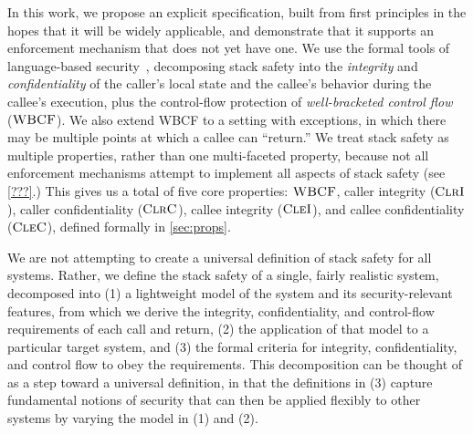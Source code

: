 In this work, we propose an explicit specification, built from first principles
in the hopes that it will be widely applicable, and demonstrate that it supports
an enforcement mechanism that does not yet have one.
We use the formal tools of language-based
security~\cite{sabelfeld2003language}, decomposing stack safety into
the {\em integrity} and {\em confidentiality} of the caller’s local state
and the callee's behavior during the callee's execution, plus the control-flow protection
of {\em well-bracketed control flow}~\cite{SkorstengaardSTKJFP} (\(\textnormal{\sc WBCF}\)).
\ifexceptions
We also extend WBCF to a setting with exceptions,
in which there may be multiple points at which a callee can ``return.''
\fi
%
We treat stack safety as multiple properties, rather than one multi-faceted property, because
not all enforcement mechanisms attempt to implement all aspects of stack safety (see \cref{???}.)
%
This gives us a total of five core properties: \(\textnormal{\sc WBCF}\),
caller integrity (\(\textnormal{\sc ClrI}\)), caller confidentiality (\(\textnormal{\sc ClrC}\)),
callee integrity (\(\textnormal{\sc CleI}\)), and callee confidentiality (\(\textnormal{\sc CleC}\)), defined formally
in \cref{sec:props}.

We are not attempting to create a universal definition of stack safety for all systems.
Rather, we define the stack safety of a single, fairly realistic system, decomposed into
(1) a lightweight model of the system and its security-relevant features, from which we
derive the integrity, confidentiality, and control-flow requirements of each call and
return, (2) the application of that model to a particular target system, and (3)
the formal criteria for integrity, confidentiality, and control flow
to obey the requirements. This decomposition can be thought of as a step toward
a universal definition, in that the definitions in (3) capture fundamental
notions of security that can then be applied flexibly to other systems by varying
the model in (1) and (2).
%

